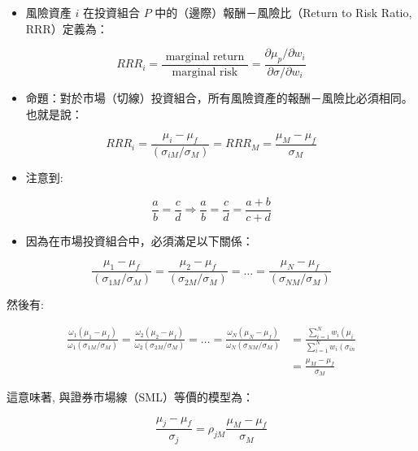 \documentclass[letterpaper]{article}
\begin{document}
\begin{itemize}
	\item 風險資產 $i$ 在投資組合 $P$ 中的（邊際）報酬－風險比（Return to Risk Ratio, RRR）定義為：
\end{itemize}

$$
R R R_{i}=\frac{\text { marginal return }}{\text { marginal risk }}=\frac{\partial \mu_{p} / \partial w_{i}}{\partial \sigma / \partial w_{i}}
$$


\begin{itemize}
	\item 命題：對於市場（切線）投資組合，所有風險資產的報酬－風險比必須相同。也就是說：
\end{itemize}


$$
R R R_{i}=\frac{\mu_{i}-\mu_{f}}{\left(\sigma_{i M} / \sigma_{M}\right)}=R R R_{M}=\frac{\mu_{M}-\mu_{f}}{\sigma_{M}}
$$

\begin{itemize}
  \item 注意到:
\end{itemize}

$$
\frac{a}{b}=\frac{c}{d} \Longrightarrow \frac{a}{b}=\frac{c}{d}=\frac{a+b}{c+d}
$$

\begin{itemize}
	\item 因為在市場投資組合中，必須滿足以下關係：
\end{itemize}

$$
\frac{\mu_{1}-\mu_{f}}{\left(\sigma_{1 M} / \sigma_{M}\right)}=\frac{\mu_{2}-\mu_{f}}{\left(\sigma_{2 M} / \sigma_{M}\right)}=\ldots=\frac{\mu_{N}-\mu_{f}}{\left(\sigma_{N M} / \sigma_{M}\right)}
$$

然後有:

$$
\begin{aligned}
\frac{\omega_{1}\left(\mu_{1}-\mu_{f}\right)}{\omega_{1}\left(\sigma_{1 M} / \sigma_{M}\right)}=\frac{\omega_{2}\left(\mu_{2}-\mu_{f}\right)}{\omega_{2}\left(\sigma_{2 M} / \sigma_{M}\right)}=\ldots=\frac{\omega_{N}\left(\mu_{N}-\mu_{f}\right)}{\omega_{N}\left(\sigma_{N M} / \sigma_{M}\right)} & =\frac{\sum_{i=1}^{N} w_{i}\left(\mu_{i}\right.}{\sum_{i=1}^{N} w_{i}\left(\sigma_{i n}\right.} \\
& =\frac{\mu_{M}-\mu_{f}}{\sigma_{M}}
\end{aligned}
$$

這意味著, 與證券市場線（SML）等價的模型為：

$$
\frac{\mu_{j}-\mu_{f}}{\sigma_{j}}=\rho_{j M} \frac{\mu_{M}-\mu_{f}}{\sigma_{M}}
$$
\end{document}
